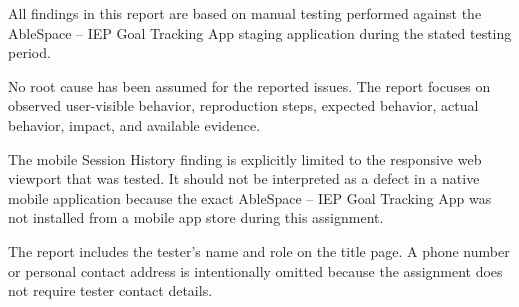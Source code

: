 \documentclass[11pt,a4paper]{article}
\begin{document}
All findings in this report are based on manual testing performed against the AbleSpace -- IEP Goal Tracking App staging application during the stated testing period.

No root cause has been assumed for the reported issues. The report focuses on observed user-visible behavior, reproduction steps, expected behavior, actual behavior, impact, and available evidence.

The mobile Session History finding is explicitly limited to the responsive web viewport that was tested. It should not be interpreted as a defect in a native mobile application because the exact AbleSpace -- IEP Goal Tracking App was not installed from a mobile app store during this assignment.

The report includes the tester's name and role on the title page. A phone number or personal contact address is intentionally omitted because the assignment does not require tester contact details.
\end{document}
